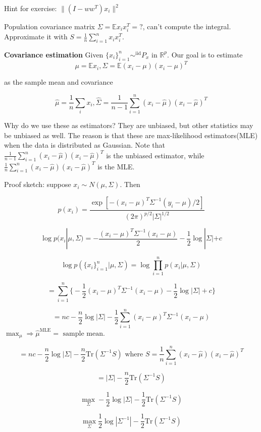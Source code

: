 \documentclass[12pt]{article}
\theoremstyle{plain}
\begin{document}
Hint for exercise: $\| (I-ww^T) x_i \|^2$

Population covariance matrix $\Sigma = \mathbb{E} x_i x_i^T = ?$, can't compute the integral. Approximate it with $S = \frac{1}{n} \sum_{i=1}^n x_i x_i^T$.

\textbf{Covariance estimation} Given $\{x_i\}_{i=1}^n \sim^\text{iid} P_x$ in $\mathbb{R}^p$. Our goal is to estimate $$\mu = \mathbb{E}x_i, \Sigma = \mathbb{E}(x_i-\mu)(x_i-\mu)^T$$

as the sample mean and covariance

$$\hat{\mu} = \frac{1}{n} \sum_i x_i, \hat{\Sigma} = \frac{1}{n-1} \sum_{i=1}^n (x_i-\hat{\mu})(x_i-\hat{\mu})^T$$

Why do we use these as estimators? They are unbiased, but other statistics may be unbiased as well. The reason is that these are max-likelihood estimators(MLE) when the data is distributed as Gaussian. Note that $\frac{1}{n-1} \sum_{i=1}^n (x_i-\hat{\mu})(x_i-\hat{\mu})^T$ is the unbiased estimator, while $\frac{1}{n} \sum_{i=1}^n (x_i-\hat{\mu})(x_i-\hat{\mu})^T$ is the MLE. 

Proof sketch: suppose $x_i \sim N(\mu, \Sigma)$. Then

$$ p(x_i) = \frac{\exp[-(x_i - \mu)^T \Sigma^{-1} (y_i - \mu) / 2]}{(2\pi)^{p/2} |\Sigma|^{1/2}} $$

$$ \log p(x_i | \mu, \Sigma) = - \frac{(x_i - \mu)^T \Sigma^{-1} (x_i - \mu)}{2} - \frac{1}{2} \log |\Sigma| + c $$

$$ \log p( \{x_i\}_{i=1}^n | \mu, \Sigma) = \log \prod_{i=1}^n p(x_i | \mu, \Sigma) $$

$$ = \sum_{i=1}^n \Big\{ -\frac{1}{2} (x_i - \mu)^T \Sigma^{-1} (x_i - \mu) - \frac{1}{2} \log |\Sigma| + c \Big\} $$


$$ = nc - \frac{n}{2} \log |\Sigma | - \frac{1}{2} \sum_{i=1}^n (x_i - \mu)^T \Sigma^{-1} (x_i - \mu) $$
$\max_\mu \Rightarrow \hat{\mu}^\text{MLE} = \text{ sample mean}$.

$$ = nc - \frac{n}{2} \log |\Sigma | - \frac{n}{2} \text{Tr} (\Sigma^{-1} S) \text{ where } S = \frac{1}{n} \sum_{i=1}^n (x_i - \hat{\mu}) (x_i -\hat{ \mu})^T $$

$$ = |\Sigma| - \frac{n}{2} \text{Tr}(\Sigma^{-1} S) $$



$$ \max_{\Sigma} -\frac{1}{2} \log |\Sigma| - \frac{1}{2} \text{Tr} ( \Sigma^{-1} S) $$

$$ \max_{\Sigma} \frac{1}{2} \log |\Sigma^{-1}| - \frac{1}{2} \text{Tr} ( \Sigma^{-1} S) $$
\end{document}

